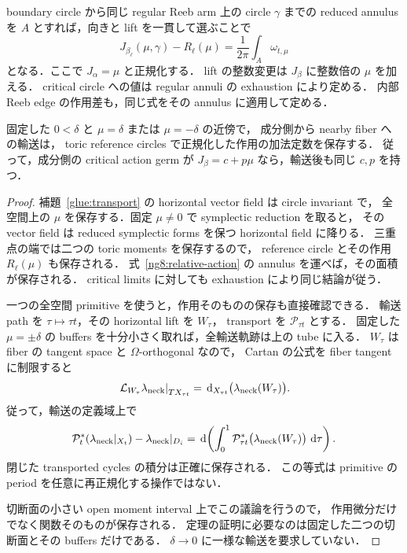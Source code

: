 boundary circle から同じ regular Reeb arm 上の circle $\gamma$ までの
reduced annulus を $A$ とすれば，向きと lift を一貫して選ぶことで
\begin{equation}\label{ng8:relative-action}
 J_{\beta_\ell}(\mu,\gamma)-R_\ell(\mu)
 =\frac1{2\pi}\int_A\omega_{t,\mu}
\end{equation}
となる．ここで $J_\alpha=\mu$ と正規化する．
lift の整数変更は $J_\beta$ に整数倍の $\mu$ を加える．
critical circle への値は regular annuli の exhaustion により定める．
内部 Reeb edge の作用差も，同じ式をその annulus に適用して定める．

\begin{lemma}[切断面における作用の加法定数の保存]
\label{ng8:transport-intercept}
固定した $0<\delta$ と $\mu=\delta$ または $\mu=-\delta$ の近傍で，
成分側から nearby fiber への輸送は，
toric reference circles で正規化した作用の加法定数を保存する．
従って，成分側の critical action germ が
$J_\beta=c+p\mu$ なら，輸送後も同じ $c,p$ を持つ．
\end{lemma}

\begin{proof}
補題~\ref{glue:transport} の horizontal vector field は circle invariant で，
全空間上の $\mu$ を保存する．固定 $\mu\ne0$ で symplectic reduction を取ると，
その vector field は reduced symplectic forms を保つ horizontal field に降りる．
三重点の端では二つの toric moments を保存するので，
reference circle とその作用 $R_\ell(\mu)$ も保存される．
式~\eqref{ng8:relative-action} の annulus を運べば，その面積が保存される．
critical limits に対しても exhaustion により同じ結論が従う．

一つの全空間 primitive を使うと，作用そのものの保存も直接確認できる．
輸送 path を $\tau\mapsto\tau t$，その horizontal lift を $W_\tau$，
transport を $\mathcal P_{\tau t}$ とする．
固定した $\mu=\pm\delta$ の buffers を十分小さく取れば，全輸送軌跡は上の tube に入る．
$W_\tau$ は fiber の tangent space と $\Omega$-orthogonal なので，
Cartan の公式を fiber tangent に制限すると
\[
 \left.\mathcal L_{W_\tau}\lambda_{\rm neck}\right|_{TX_{\tau t}}
 =\,\mathrm d_{X_{\tau t}}\bigl(\lambda_{\rm neck}(W_\tau)\bigr).
\]
従って，輸送の定義域上で
\begin{equation}\label{ng8:exact-transport}
 \mathcal P_t^*(\lambda_{\rm neck}|_{X_t})
   -\lambda_{\rm neck}|_{D_i}
 =\,\mathrm d\!\left(\int_0^1
       \mathcal P_{\tau t}^*\bigl(\lambda_{\rm neck}(W_\tau)\bigr)
       \,\,\mathrm d\tau\right).
\end{equation}
閉じた transported cycles の積分は正確に保存される．
この等式は primitive の period を任意に再正規化する操作ではない．

切断面の小さい open moment interval 上でこの議論を行うので，
作用微分だけでなく関数そのものが保存される．
定理の証明に必要なのは固定した二つの切断面とその buffers だけである．
$\delta\to0$ に一様な輸送を要求していない．
\end{proof}

